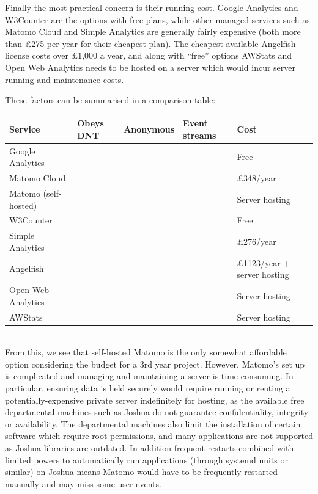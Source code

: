 \documentclass[a4paper,fleqn,oneside,12pt]{report}
\newcommand{\cmark}{\ding{51}}
\newcommand{\xmark}{\ding{55}}
\begin{document}
Finally the most practical concern is their running cost. Google Analytics and W3Counter are the options with free plans, while other managed services such as Matomo Cloud and Simple Analytics are generally fairly expensive (both more than £275 per year for their cheapest plan). The cheapest available Angelfish license costs over £1,000 a year, and along with “free” options AWStats and Open Web Analytics needs to be hosted on a server which would incur server running and maintenance costs.

These factors can be summarised in a comparison table:

\begin{adjustbox}{center}\begin{tabular}{ |l|l|l|l|l| }
  \hline
  \textbf{Service} & \textbf{Obeys DNT} & \textbf{Anonymous} & \textbf{Event streams} & \textbf{Cost} \\
  \hline
  Google Analytics & \xmark & \xmark & \xmark & Free \\
  \hline
  Matomo Cloud & \cmark & \cmark & \cmark & £348/year \\
  \hline
  Matomo (self-hosted) & \cmark & \cmark & \cmark & Server hosting \\
  \hline
  W3Counter & \xmark & \xmark & \cmark & Free \\
  \hline
  Simple Analytics & \cmark & \cmark & \cmark & £276/year \\
  \hline
  Angelfish & \xmark & \xmark & \cmark & £1123/year + server hosting \\
  \hline
  Open Web Analytics & \xmark & \xmark & \cmark & Server hosting \\
  \hline
  AWStats & \xmark & \xmark & \xmark & Server hosting \\
  \hline
\end{tabular}\end{adjustbox}\\

From this, we see that self-hosted Matomo is the only somewhat affordable option considering the budget for a 3rd year project. However, Matomo’s set up is complicated and managing and maintaining a server is time-consuming. In particular, ensuring data is held securely would require running or renting a potentially-expensive private server indefinitely for hosting, as the available free departmental machines such as Joshua do not guarantee confidentiality, integrity or availability. The departmental machines also limit the installation of certain software which require root permissions, and many applications are not supported as Joshua libraries are outdated. In addition frequent restarts combined with limited powers to automatically run applications (through systemd units or similar) on Joshua means Matomo would have to be frequently restarted manually and may miss some user events.
\end{document}
